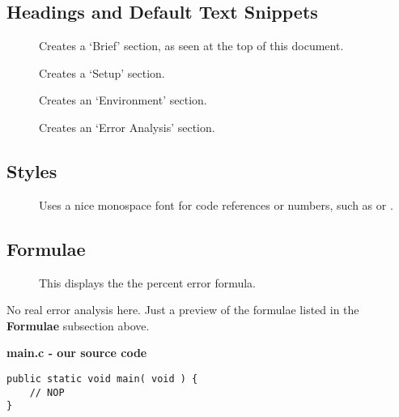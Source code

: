 \documentclass{technical_assignment_report}
\begin{document}
\subsection*{Headings and Default Text Snippets}
\begin{description}
\item[] Creates a \lq{}Brief\rq{} section, as seen at the top of this document.
\item[]  Creates a \lq{}Setup\rq{} section.
\item[] Creates an \lq{}Environment\rq{} section.
\item[] Creates an \lq{}Error Analysis\rq{} section.
\end{description}

\subsection*{Styles}
\begin{description}
\item[] Uses a nice monospace font for code references or numbers, such as  or .
\end{description}

\subsection*{Formulae}
\begin{description}
\item[] This displays the the percent error formula. 
\end{description}

\erroranalysis
No real error analysis here. Just a preview of the formulae listed in the {\bf Formulae} subsection above.


{\bf main.c - our source code \assignment}
\begin{verbatim}
public static void main( void ) {
    // NOP
}
\end{verbatim}
\end{document}
